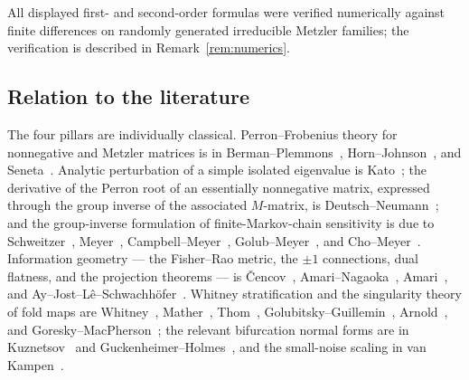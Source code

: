 \documentclass[11pt,reqno]{amsart}
\theoremstyle{plain}
\theoremstyle{definition}
\theoremstyle{remark}
\begin{document}
All displayed first- and second-order formulas were verified numerically against
finite differences on randomly generated irreducible Metzler families; the
verification is described in Remark~\ref{rem:numerics}.

\subsection{Relation to the literature}
The four pillars are individually classical. Perron--Frobenius theory for
nonnegative and Metzler matrices is in
Berman--Plemmons~\cite{BermanPlemmons1994},
Horn--Johnson~\cite{HornJohnson2013}, and Seneta~\cite{Seneta2006}. Analytic
perturbation of a simple isolated eigenvalue is Kato~\cite{Kato1995}; the
derivative of the Perron root of an essentially nonnegative matrix, expressed
through the group inverse of the associated $M$-matrix, is
Deutsch--Neumann~\cite{DeutschNeumann1984}; and the group-inverse formulation of
finite-Markov-chain sensitivity is due to
Schweitzer~\cite{Schweitzer1968}, Meyer~\cite{Meyer1975},
Campbell--Meyer~\cite{CampbellMeyer2009}, Golub--Meyer~\cite{GolubMeyer1986},
and Cho--Meyer~\cite{ChoMeyer2001}. Information geometry --- the Fisher--Rao
metric, the $\pm1$ connections, dual flatness, and the projection theorems --- is
\v{C}encov~\cite{Cencov1982}, Amari--Nagaoka~\cite{AmariNagaoka2000},
Amari~\cite{Amari2016}, and Ay--Jost--L\^e--Schwachh\"ofer~\cite{Ay2017}. Whitney
stratification and the singularity theory of fold maps are
Whitney~\cite{Whitney1965}, Mather~\cite{Mather2012}, Thom~\cite{Thom1969},
Golubitsky--Guillemin~\cite{GolubitskyGuillemin1973},
Arnold~\cite{Arnold1992}, and Goresky--MacPherson~\cite{GoreskyMacPherson1988};
the relevant bifurcation normal forms are in Kuznetsov~\cite{Kuznetsov2004} and
Guckenheimer--Holmes~\cite{GuckenheimerHolmes1983}, and the small-noise scaling in
van Kampen~\cite{vanKampen2007}.
\end{document}
